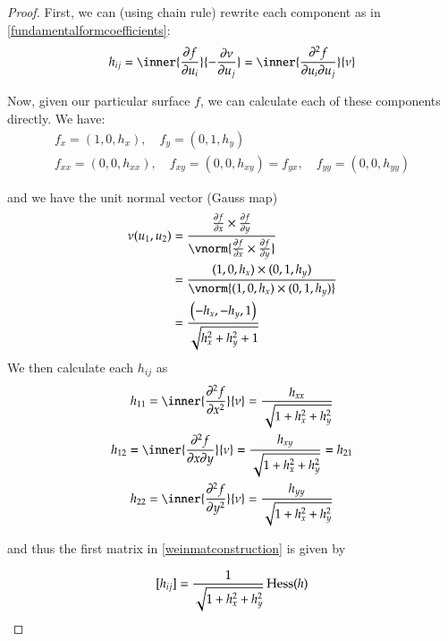       	\begin{proof}
       		First, we can (using chain rule) rewrite each component as in  \cref{fundamentalformcoefficients}:
      		 \[ h_{ij} = \inner{\frac{\partial f}{\partial u_i}}{-\frac{\partial \nu}{\partial u_j}}
       		= \inner{\frac{\partial^2 f}{\partial u_i \partial u_j}}{\nu} \]
       		
       		Now, given our particular surface $f$, we can calculate each of these components directly. We have:
       		\begin{equation}
       		\begin{gathered}
       		f_{x} = (1, 0, h_x) , \quad
       		f_{y} = (0, 1, h_y)  \\
       		f_{xx} = (0, 0, h_{xx}) , \quad
       		f_{xy} = (0, 0, h_{xy}) = f_{yx} , \quad
       		f_{yy} = (0, 0, h_{yy})
       		\end{gathered}
       		\end{equation}
       		
       		and we have the unit normal vector (Gauss map)
       		\begin{align}
       		\nu(u_1, u_2) &=
       		\frac{\frac{\partial f}{\partial x} \times \frac{\partial f}{\partial y}}
       		{\vnorm{\frac{\partial f}{\partial x} \times \frac{\partial f}{\partial y}}} \\
       		&= \frac{(1, 0, h_x) \times (0, 1, h_y)}{\vnorm{(1, 0, h_x) \times (0, 1, h_y)}} \\
       		&= \frac{\left( -h_x , -h_y , 1 \right)}{\sqrt{h_x^2 + h_y^2 + 1}}
	 \end{align}
	 We then calculate each $h_{ij}$ as
	 \begin{equation}
	 \begin{gathered}
	 h_{11} = \inner{\frac{\partial^2 f}{\partial x^2}}{\nu} = 
		 \frac{h_{xx}}{\sqrt{1+h_x^2 + h_y^2}} \\
	  h_{12} = \inner{\frac{\partial^2 f}{\partial x \partial y}}{\nu} = 
	  \frac{h_{xy}}{\sqrt{1+h_x^2 + h_y^2}} = h_{21} \\
	  h_{22} = \inner{\frac{\partial^2 f}{\partial y^2}}{\nu} = 
	  \frac{h_{yy}}{\sqrt{1+h_x^2 + h_y^2}} \\
	 \end{gathered}
	 \end{equation}
	 
	 and thus the first matrix in \cref{weinmatconstruction} is given by
	 
	 \begin{equation} \label{hij_exactgraph}
	 [h_{ij}] = \frac{1}{\sqrt{1+h_x^2 + h_y^2}} \,  \mathrm{Hess} (h)
	 \end{equation}
	 

\end{proof}
